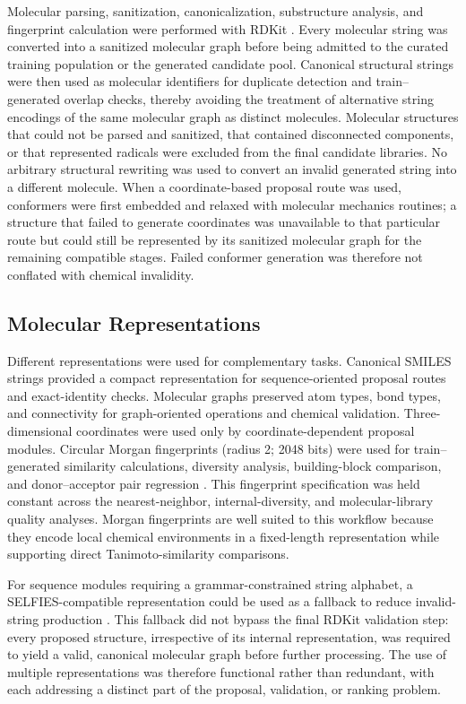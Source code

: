 \documentclass[12pt]{article}
\begin{document}
Molecular parsing, sanitization, canonicalization, substructure analysis, and fingerprint calculation were performed with RDKit \cite{landrum2013rdkit}. Every molecular string was converted into a sanitized molecular graph before being admitted to the curated training population or the generated candidate pool. Canonical structural strings were then used as molecular identifiers for duplicate detection and train--generated overlap checks, thereby avoiding the treatment of alternative string encodings of the same molecular graph as distinct molecules. Molecular structures that could not be parsed and sanitized, that contained disconnected components, or that represented radicals were excluded from the final candidate libraries. No arbitrary structural rewriting was used to convert an invalid generated string into a different molecule. When a coordinate-based proposal route was used, conformers were first embedded and relaxed with molecular mechanics routines; a structure that failed to generate coordinates was unavailable to that particular route but could still be represented by its sanitized molecular graph for the remaining compatible stages. Failed conformer generation was therefore not conflated with chemical invalidity.

\subsection{Molecular Representations}
Different representations were used for complementary tasks. Canonical SMILES strings provided a compact representation for sequence-oriented proposal routes and exact-identity checks. Molecular graphs preserved atom types, bond types, and connectivity for graph-oriented operations and chemical validation. Three-dimensional coordinates were used only by coordinate-dependent proposal modules. Circular Morgan fingerprints (radius 2; 2048 bits) were used for train--generated similarity calculations, diversity analysis, building-block comparison, and donor--acceptor pair regression \cite{rogers2010extended}. This fingerprint specification was held constant across the nearest-neighbor, internal-diversity, and molecular-library quality analyses. Morgan fingerprints 
are well suited to this workflow because they encode local chemical environments in a fixed-length representation while supporting direct Tanimoto-similarity comparisons.

For sequence modules requiring a grammar-constrained string alphabet, a SELFIES-compatible representation could be used as a fallback to reduce invalid-string production \cite{krenn2020self}. This fallback did not bypass the final RDKit validation step: every proposed structure, irrespective of its internal representation, was required to yield a valid, canonical molecular graph before further processing. The use of multiple representations was therefore functional rather than redundant, with each addressing a distinct part of the proposal, validation, or ranking problem.
\end{document}

